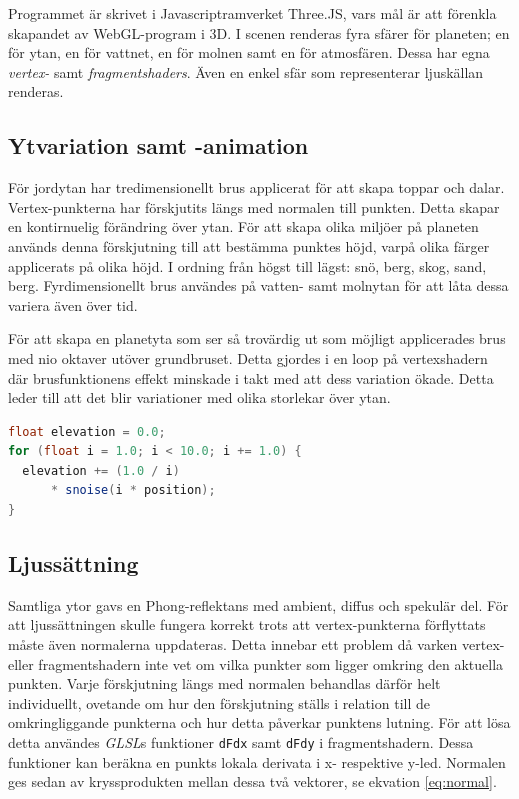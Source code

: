 \documentclass[conference]{IEEEtran}
\begin{document}
Programmet är skrivet i Javascriptramverket Three.JS, vars mål är att förenkla skapandet av WebGL-program i 3D. I scenen renderas fyra sfärer för planeten; en för ytan, en för vattnet, en för molnen samt en för atmosfären. Dessa har egna \emph{vertex-} samt \emph{fragmentshaders}. Även en enkel sfär som representerar ljuskällan renderas.

\subsection{Ytvariation samt -animation}

För jordytan har tredimensionellt brus applicerat för att skapa toppar och dalar. Vertex-punkterna har förskjutits längs med normalen till punkten. Detta skapar en kontirnuelig förändring över ytan. För att skapa olika miljöer på planeten används denna förskjutning till att bestämma punktes höjd, varpå olika färger applicerats på olika höjd. I ordning från högst till lägst: snö, berg, skog, sand, berg. Fyrdimensionellt brus användes på vatten- samt molnytan för att låta dessa variera även över tid.

För att skapa en planetyta som ser så trovärdig ut som möjligt applicerades brus med nio oktaver utöver grundbruset. Detta gjordes i en loop på vertexshadern där brusfunktionens effekt minskade i takt med att dess variation ökade. Detta leder till att det blir variationer med olika storlekar över ytan.

\begin{lstlisting}[language=GLSL,caption=Uträkning av höjdförändringen för planetytan (GLSL),label={lst:elevation}]
float elevation = 0.0;
for (float i = 1.0; i < 10.0; i += 1.0) {
  elevation += (1.0 / i)
      * snoise(i * position);
}
\end{lstlisting}

\subsection{Ljussättning}

Samtliga ytor gavs en Phong-reflektans med ambient, diffus och spekulär del. För att ljussättningen skulle fungera korrekt trots att vertex-punkterna förflyttats måste även normalerna uppdateras. Detta innebar ett problem då varken vertex- eller fragmentshadern inte vet om vilka punkter som ligger omkring den aktuella punkten. Varje förskjutning längs med normalen behandlas därför helt individuellt, ovetande om hur den förskjutning ställs i relation till de omkringliggande punkterna och hur detta påverkar punktens lutning. För att lösa detta användes \emph{GLSL}s funktioner \texttt{dFdx} samt \texttt{dFdy} i fragmentshadern. Dessa funktioner kan beräkna en punkts lokala derivata i x- respektive y-led. Normalen ges sedan av kryssprodukten mellan dessa två vektorer, se ekvation \ref{eq:normal}.
\end{document}
